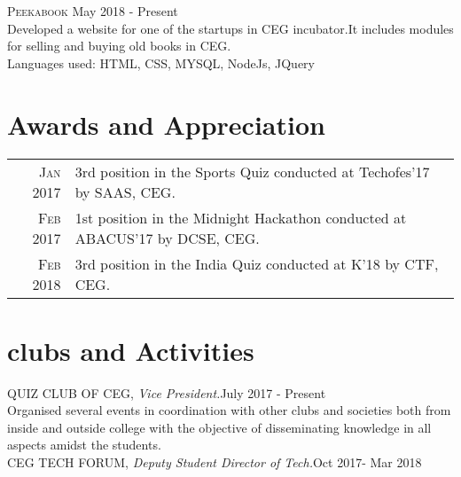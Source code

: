 \documentclass[a4paper,10pt]{article}
\begin{document}
\textsc{Peekabook} \hfill May 2018 - Present \\
 Developed a website for one of the startups in CEG incubator.It includes modules for selling and buying old books in CEG.\\
Languages used: HTML, CSS, MYSQL, NodeJs, JQuery
\section{Awards and Appreciation}
\begin{tabular}{rl}

\textsc{Jan} 2017 &3rd position in the Sports Quiz conducted at Techofes'17 by SAAS, CEG.  \\
 \textsc{Feb} 2017 &1st position in the Midnight Hackathon conducted at  ABACUS’17 by DCSE, CEG. \\
\textsc{Feb} 2018 & 3rd position in the India Quiz conducted at K'18 by CTF, CEG.
\end{tabular}

\section{clubs and Activities}
QUIZ CLUB OF CEG, \emph{Vice President.}\hfill July 2017 - Present\\
Organised several events in coordination with other clubs and societies both from inside and outside college with the objective of disseminating knowledge in all aspects amidst the students.\\

CEG TECH FORUM, \emph{Deputy Student Director of Tech.}\hfill Oct 2017- Mar 2018
\end{document}
